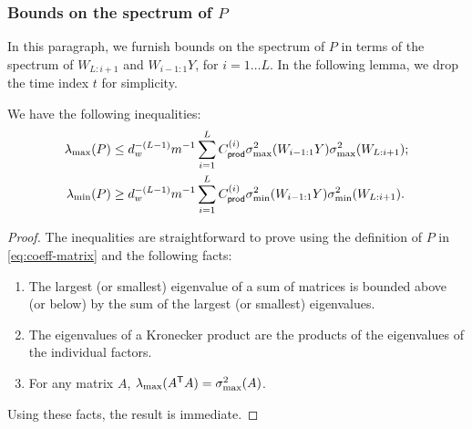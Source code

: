 \subsubsection{Bounds on the spectrum of $P$}
In this paragraph, we furnish bounds on the spectrum of $P$ in terms of the spectrum of $W_{L:i+1}$ and $W_{i-1:1} Y$, for $i = 1 \ldots L$. In the following lemma, we drop the time index $t$ for
simplicity.
\label{sec:bounding spectrum of p}
\begin{lemma}
	\label{lemma:P-k-spectrum}
	We have the following inequalities:
	\begin{align}
		\lambda_{\max}(P)
		 & \leq d_w^{-(L-1)}m^{-1}
		\sum_{i=1}^L
		C_{\mathsf{prod}}^{({i})} \sigma_{\max}^2(W_{i-1:1} Y) \sigma_{\max}^2(W_{L:i+1}); \label{eq:lambda-max-pk} \\
		\lambda_{\min}(P)
		 & \geq d_w^{-(L-1)}m^{-1}
		\sum_{i=1}^L
		C_{\mathsf{prod}}^{({i})} \sigma_{\min}^2(W_{i-1:1} Y) \sigma_{\min}^2(W_{L:i+1}). \label{eq:lambda-min-pk}
	\end{align}
\end{lemma}
\begin{proof}
	The inequalities are straightforward to prove using the definition of $P$ in \cref{eq:coeff-matrix} and the following facts:
	\begin{enumerate}
		\item The largest (or smallest) eigenvalue of a sum of matrices is bounded above (or below) by the sum of the largest (or smallest) eigenvalues.
		\item The eigenvalues of a Kronecker product are the products of the eigenvalues of the individual factors.
		\item For any matrix $A$, $\lambda_{\max}(A^{\mathsf{T}} A) = \sigma_{\max}^2(A)$.
	\end{enumerate}
	Using these facts, the result is immediate.
\end{proof}
